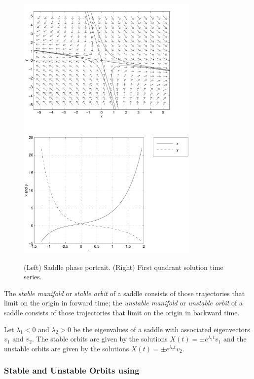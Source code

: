 \documentclass{ximera}
\begin{document}
\begin{figure}[htb]
           \centerline{%
	   \includegraphics[width=3.5in]{../figures/linpnb.pdf}
           \includegraphics[width=3.5in]{../figures/linpnts.pdf}}
           \caption{(Left) Saddle phase portrait.
	(Right) First quadrant solution time series.}
           \label{F:linsaddle}
\end{figure}

\begin{definition} \label{D:stablemfld}
The {\em stable manifold\/} or {\em stable orbit\/} of a saddle consists of
those trajectories that limit on the origin in forward time; the
{\em unstable manifold\/} or {\em unstable orbit\/} of a saddle consists of
those trajectories that limit on the origin in backward time.
\end{definition}
 
 

Let $\lambda_1<0$ and $\lambda_2>0$ be the eigenvalues of a saddle with
associated eigenvectors $v_1$ and $v_2$.  The stable orbits are given by the
solutions $X(t) = \pm e^{\lambda_1 t}v_1$ and the unstable orbits are given
by the solutions $X(t) = \pm e^{\lambda_2 t}v_2$.

\subsubsection*{Stable and Unstable Orbits using {\sf \pplane}}
\end{document}
